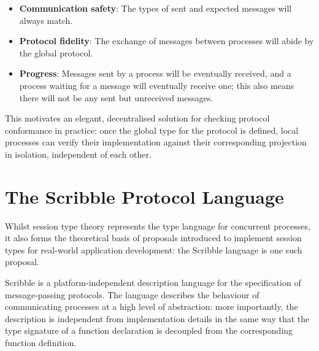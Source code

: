 \begin{itemize}
\item \textbf{Communication safety}: The types of sent and expected messages will always match.
\item \textbf{Protocol fidelity}: The exchange of messages between processes will abide by the global protocol.
\item \textbf{Progress}: Messages sent by a process will be eventually received, and a process waiting for a message will eventually receive one; this also means there will not be any sent but unreceived messages.
\end{itemize}

This motivates an elegant, decentralised solution for checking protocol conformance in practice: once the global type for the protocol is defined, local processes can verify their implementation against their corresponding projection in isolation, independent of each other. 

%



\section{The Scribble Protocol Language}

Whilst session type theory represents the type language for concurrent processes, it also forms the theoretical basis of proposals introduced to implement session types for real-world application development: the Scribble language is one such proposal.

Scribble \cite{Scribble} is a platform-independent description language for the specification of message-passing protocols. The language describes the behaviour of communicating processes at a high level of abstraction: more importantly, the description is independent from implementation details in the same way that the type signature of a function declaration is decoupled from the corresponding function definition.

